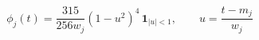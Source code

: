 \documentclass{article}
\begin{document}
\fontsize{22}{29}\selectfont
\[
\phi_j(t)=\frac{315}{256w_j}(1-u^2)^4\,\mathbf{1}_{|u|<1},\qquad u=\frac{t-m_j}{w_j}
\]
\end{document}
